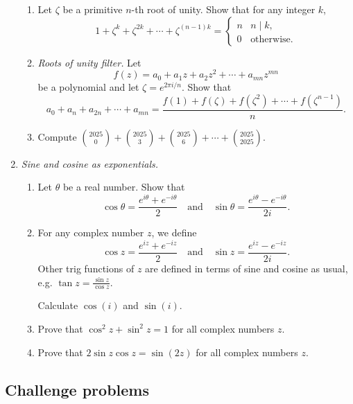 \begin{enumerate}
\begin{enumerate}
\item Let $\zeta$ be a primitive $n$-th root of unity. Show that for any integer $k$,
\begin{equation*}
1 + \zeta^k + \zeta^{2k} + \cdots + \zeta^{(n - 1)k} = \begin{cases} n & n\mid k, \\ 0 & \text{otherwise}. \end{cases}
\end{equation*}
\item \textit{Roots of unity filter.} Let
\begin{equation*}
f(z) = a_0 + a_1z + a_2z^2 + \cdots + a_{mn}z^{mn}
\end{equation*}
be a polynomial and let $\zeta = e^{2\pi i/n}$. Show that
\begin{equation*}
a_0 + a_n + a_{2n} + \cdots + a_{mn} = \frac{f(1) + f(\zeta) + f(\zeta^2) + \cdots + f(\zeta^{n - 1})}{n}.
\end{equation*}
\item Compute $\binom{2025}{0} + \binom{2025}{3} + \binom{2025}{6} + \cdots + \binom{2025}{2025}$.
\end{enumerate}
\item \emph{Sine and cosine as exponentials.} 
\begin{enumerate}
\item Let $\theta$ be a real number. Show that
\begin{equation*}
\cos\theta = \frac{e^{i\theta} + e^{-i\theta}}{2}\quad\text{and}\quad\sin\theta = \frac{e^{i\theta} - e^{-i\theta}}{2i}.
\end{equation*}
\item For any complex number $z$, we define
\begin{equation*}
\cos z = \frac{e^{iz} + e^{-iz}}{2}\quad\text{and}\quad\sin z = \frac{e^{iz} - e^{-iz}}{2i}.
\end{equation*}
Other trig functions of $z$ are defined in terms of sine and cosine as usual, e.g. $\tan z = \frac{\sin z}{\cos z}$.\par
Calculate $\cos(i)$ and $\sin(i)$.
\item Prove that $\cos^2 z + \sin^2 z = 1$ for all complex numbers $z$.
\item Prove that $2\sin z\cos z = \sin(2z)$ for all complex numbers $z$.
\end{enumerate}
\end{enumerate}


\subsection{Challenge problems}

